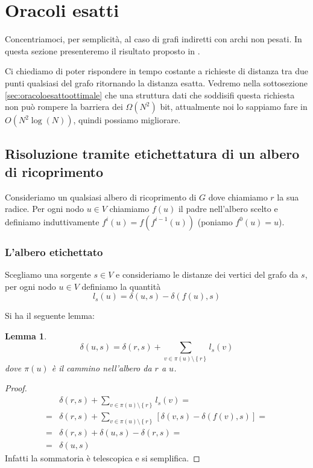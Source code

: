 \documentclass[a4paper,10pt]{amsbook}
\newcounter{counter1}
\theoremstyle{plain}
\newtheorem{mylem}[counter1]{Lemma}
\theoremstyle{definition}
\theoremstyle{remark}
\newcommand{\set}[1]{\left\{#1\right\}}
\newcommand{\pa}[1]{\left(#1\right)}
\newcommand{\bra}[1]{\left[#1\right]}
\begin{document}
\section{Oracoli esatti}
\label{sec:oracoliesatti}

Concentriamoci, per semplicit\`a, al caso di grafi indiretti con archi
non pesati. In questa sezione presenteremo il risultato proposto in
\cite{compactdistance}.

Ci chiediamo di poter rispondere in tempo costante a richieste di
distanza tra due punti qualsiasi del grafo ritornando la distanza
esatta. Vedremo nella sottosezione \ref{sec:oracoloesattoottimale} che
una struttura dati che soddisifi questa richiesta non pu\`o rompere la
barriera dei $\Omega\pa{ N^2}$ bit, attualmente noi lo sappiamo fare
in $O\pa{N^2 \log\pa{ N}}$, quindi possiamo migliorare.


\subsection{Risoluzione tramite etichettatura di un albero di ricoprimento}

Consideriamo un qualsiasi albero di ricoprimento di $G$ dove chiamiamo
$r$ la sua radice. Per ogni nodo $u\in V$ chiamiamo $f(u)$ il padre
nell'albero scelto e definiamo induttivamente $f^i(u) =
f\pa{f^{i-1}(u)}$ (poniamo $f^0(u)=u$).

\subsubsection{L'albero etichettato}

Scegliamo una sorgente $s\in V$ e consideriamo le distanze dei vertici
del grafo da $s$, per ogni nodo $u\in V$ definiamo la quantit\`a
\[ l_s (u) = \delta\pa{ u,s } - \delta\pa{ f(u),s} \]

Si ha il seguente lemma:
\begin{mylem}
  \[ \delta\pa{ u,s} = \delta\pa{ r,s} + \sum _{v\in \pi (u)\setminus
    \set{r}} l_s(v) \] dove $\pi (u)$ \`e il cammino nell'albero da
  $r$ a $u$.
\end{mylem}
\begin{proof}
  \begin{align*}
    &\delta\pa{ r,s} + \sum _{v\in \pi (u)\setminus \set{r}} l_s(v) =\\
    =& \delta\pa{ r,s} + \sum _{v\in \pi (u)\setminus \set{r}} \bra{
      \delta\pa{ v,s } - \delta\pa{ f(v),s} } =\\
    = & \delta\pa{ r,s} + \delta\pa{ u,s} - \delta\pa{ r,s}=\\
    = & \delta\pa{ u,s}
  \end{align*}
  Infatti la sommatoria \`e telescopica e si semplifica.
\end{proof}
\end{document}
